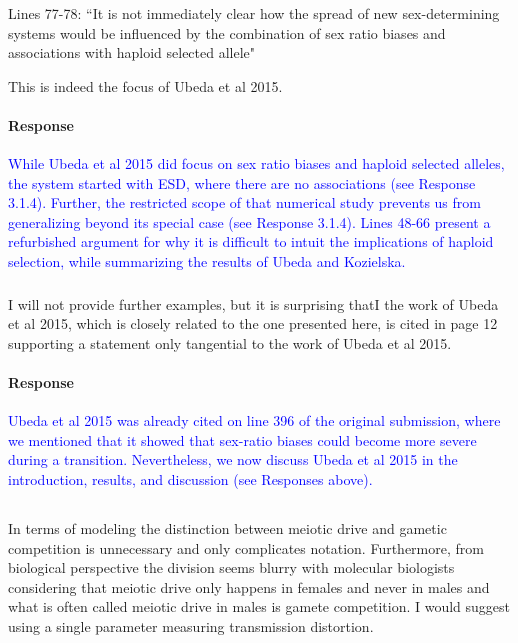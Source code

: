 \documentclass[10pt,letterpaper]{article}
\begin{document}
\noindent\subsubsection{}
Lines 77-78: ``It is not immediately clear how the spread of new sex-determining systems would be influenced by the combination of sex ratio biases and associations with haploid selected allele"

This is indeed the focus of Ubeda et al 2015.

\noindent\paragraph{Response}
\textcolor{blue}{While Ubeda et al 2015 did focus on sex ratio biases and haploid selected alleles, the system started with ESD, where there are no associations (see Response 3.1.4).
Further, the restricted scope of that numerical study prevents us from generalizing beyond its special case (see Response 3.1.4).
Lines 48-66 present a refurbished argument for why it is difficult to intuit the implications of haploid selection, while summarizing the results of Ubeda and Kozielska.
}

\noindent\subsubsection{}
I will not provide further examples, but it is surprising thatI the work of Ubeda et al 2015, which is closely related to the one presented here, is cited in page 12 supporting a statement only tangential to the work of Ubeda et al 2015.

\noindent\paragraph{Response}
\textcolor{blue}{Ubeda et al 2015 was already cited on line 396 of the original submission, where we mentioned that it showed that sex-ratio biases could become more severe during a transition.
Nevertheless, we now discuss Ubeda et al 2015 in the introduction, results, and discussion (see Responses above).}

\noindent\subsection{}
In terms of modeling the distinction between meiotic drive and gametic competition is unnecessary and only complicates notation. Furthermore, from biological perspective the division seems blurry with molecular biologists considering that meiotic drive only happens in females and never in males and what is often called meiotic drive in males is gamete competition. I would suggest using a single parameter measuring transmission distortion.
\end{document}
